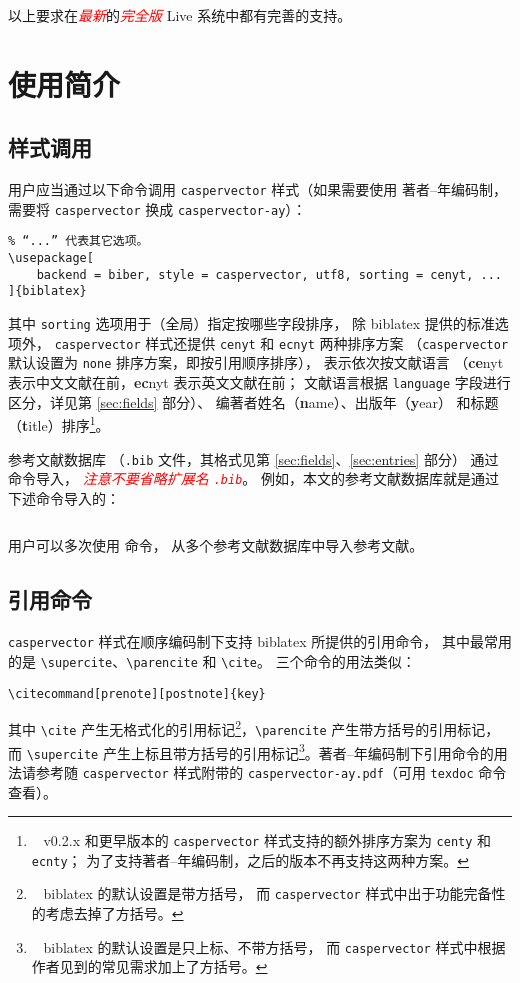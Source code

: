 \documentclass[UTF8]{ctexart}
\newcommand{\myemph}[1]{\emph{\textcolor{red}{#1}}}
\begin{document}
以上要求在\myemph{最新}的\myemph{完全版}
 Live 系统中都有完善的支持。

\section{使用简介}
\subsection{样式调用}

用户应当通过以下命令调用 \verb|caspervector| 样式（如果需要使用
著者--年编码制，需要将 \verb|caspervector| 换成 \verb|caspervector-ay|）：
\begin{Verbatim}[frame = single]
% “utf8”可能需要改为“gbk”，根据用户使用的字符编码而定。
% “...” 代表其它选项。
\usepackage[
	backend = biber, style = caspervector, utf8, sorting = cenyt, ...
]{biblatex}
\end{Verbatim}
其中 \verb|sorting| 选项用于（全局）指定按哪些字段排序，
除 biblatex 提供的标准选项\supercite{biblatex}外，%
\verb|caspervector| 样式还提供 \verb|cenyt| 和 \verb|ecnyt| 两种排序方案
（\verb|caspervector| 默认设置为 \verb|none| 排序方案，即按引用顺序排序），
表示依次按文献语言
（\textbf{ce}nyt 表示中文文献在前，\textbf{ec}nyt 表示英文文献在前；
文献语言根据 \verb|language| 字段进行区分，详见第 \ref{sec:fields} 部分）、
编著者姓名（\textbf{n}ame）、出版年（\textbf{y}ear）
和标题（\textbf{t}itle）排序\footnote{\ %
	v0.2.x 和更早版本的 \texttt{caspervector}
	样式支持的额外排序方案为 \texttt{centy} 和 \texttt{ecnty}；
	为了支持著者--年编码制，之后的版本不再支持这两种方案。%
}。

参考文献数据库
（\verb|.bib| 文件，其格式见第 \ref{sec:fields}、\ref{sec:entries} 部分）
通过 \verb|| 命令导入，%
\myemph{注意不要省略扩展名 \texttt{.bib}}。
例如，本文的参考文献数据库就是通过下述命令导入的：
\begin{Verbatim}[frame = single]

\end{Verbatim}
用户可以多次使用 \verb|| 命令，
从多个参考文献数据库中导入参考文献。

\subsection{引用命令}

\verb|caspervector| 样式在顺序编码制下支持 biblatex 所提供的引用命令，
其中最常用的是 \verb|\supercite|、\verb|\parencite| 和 \verb|\cite|。
三个命令的用法类似：
\begin{Verbatim}[frame = single]
% 可选参数 prenote 和 postnote 分别用于设定引用记号前、后的注释。
\citecommand[prenote][postnote]{key}
\end{Verbatim}
其中 \verb|\cite| 产生无格式化的引用标记\footnote{\ %
	biblatex 的默认设置是带方括号，
	而 \texttt{caspervector} 样式中出于功能完备性的考虑去掉了方括号。%
}，\verb|\parencite| 产生带方括号的引用标记，
而 \verb|\supercite| 产生上标且带方括号的引用标记\footnote{\ %
	biblatex 的默认设置是只上标、不带方括号，
	而 \texttt{caspervector} 样式中根据作者见到的常见需求加上了方括号。%
}。著者--年编码制下引用命令的用法请参考随 \verb|caspervector|
样式附带的 \verb|caspervector-ay.pdf|（可用 \verb|texdoc| 命令查看）。
\end{document}
